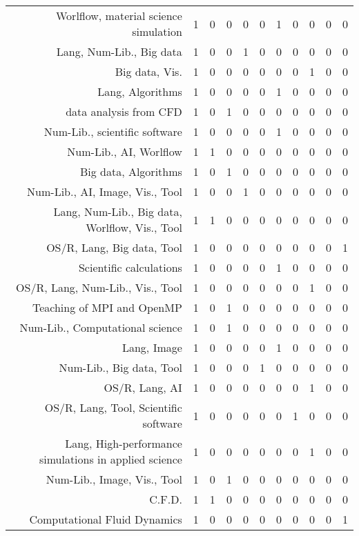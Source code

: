 {\begin{landscape}
\begin{longtable}[htb]{r|c|c|c|c|c|c|c|c|c|c}
{Worlflow, material science simulation} & 1 & 0 & 0 & 0 & 0 & 1 & 0 & 0 & 0 & 0 \\%
{Lang, Num-Lib., Big data} & 1 & 0 & 0 & 1 & 0 & 0 & 0 & 0 & 0 & 0 \\%
{Big data, Vis.} & 1 & 0 & 0 & 0 & 0 & 0 & 0 & 1 & 0 & 0 \\%
{Lang, Algorithms} & 1 & 0 & 0 & 0 & 0 & 1 & 0 & 0 & 0 & 0 \\%
{data analysis from CFD} & 1 & 0 & 1 & 0 & 0 & 0 & 0 & 0 & 0 & 0 \\%
{Num-Lib., scientific software} & 1 & 0 & 0 & 0 & 0 & 1 & 0 & 0 & 0 & 0 \\%
{Num-Lib., AI, Worlflow} & 1 & 1 & 0 & 0 & 0 & 0 & 0 & 0 & 0 & 0 \\%
{Big data, Algorithms} & 1 & 0 & 1 & 0 & 0 & 0 & 0 & 0 & 0 & 0 \\%
{Num-Lib., AI, Image, Vis., Tool} & 1 & 0 & 0 & 1 & 0 & 0 & 0 & 0 & 0 & 0 \\%
{Lang, Num-Lib., Big data, Worlflow, Vis., Tool} & 1 & 1 & 0 & 0 & 0 & 0 & 0 & 0 & 0 & 0 \\%
{OS/R, Lang, Big data, Tool} & 1 & 0 & 0 & 0 & 0 & 0 & 0 & 0 & 0 & 1 \\%
{Scientific calculations} & 1 & 0 & 0 & 0 & 0 & 1 & 0 & 0 & 0 & 0 \\%
{OS/R, Lang, Num-Lib., Vis., Tool} & 1 & 0 & 0 & 0 & 0 & 0 & 0 & 1 & 0 & 0 \\%
{Teaching of MPI and OpenMP} & 1 & 0 & 1 & 0 & 0 & 0 & 0 & 0 & 0 & 0 \\%
{Num-Lib., Computational science} & 1 & 0 & 1 & 0 & 0 & 0 & 0 & 0 & 0 & 0 \\%
{Lang, Image} & 1 & 0 & 0 & 0 & 0 & 1 & 0 & 0 & 0 & 0 \\%
{Num-Lib., Big data, Tool} & 1 & 0 & 0 & 0 & 1 & 0 & 0 & 0 & 0 & 0 \\%
{OS/R, Lang, AI} & 1 & 0 & 0 & 0 & 0 & 0 & 0 & 1 & 0 & 0 \\%
{OS/R, Lang, Tool, Scientific software} & 1 & 0 & 0 & 0 & 0 & 0 & 1 & 0 & 0 & 0 \\%
{Lang, High-performance simulations in applied science} & 1 & 0 & 0 & 0 & 0 & 0 & 0 & 1 & 0 & 0 \\%
{Num-Lib., Image, Vis., Tool} & 1 & 0 & 1 & 0 & 0 & 0 & 0 & 0 & 0 & 0 \\%
{C.F.D.} & 1 & 1 & 0 & 0 & 0 & 0 & 0 & 0 & 0 & 0 \\%
{Computational Fluid Dynamics} & 1 & 0 & 0 & 0 & 0 & 0 & 0 & 0 & 0 & 1 \\%

\end{longtable}
\end{landscape}}
